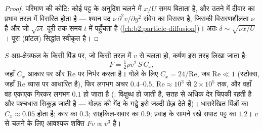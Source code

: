 \begin{proof}
परिमाण की कोटि: कोई  पट्ट के अनुदिश चलने में $x/U$ समय बिताता
है, और उतने में दीवार का प्रभाव तरल में विसरित होता है --- श्यान पद
$\nu\,\partial^2v/\partial y^2$ संवेग का विसरण है, जिसकी विसरणशीलता $\nu$ है
और जो $\sqrt{\nu t}$ दूरी तक समय $t$ में पहुँचता है
(\cref{ch:b2:particle-diffusion})। अतः $\delta \sim \sqrt{\nu x
/U}$। पूरा (प्रांटल) सिद्धांत स्वीकृत है।
\end{proof}

\begin{proposition}[ऊँची रेनल्ड्स संख्या पर कर्षण]\label{prop:b2:viscous-flows:drag}
$S$ अग्र-क्षेत्रफल के किसी पिंड पर, जो किसी तरल में $v$ से चलता हो,
कर्षण इस तरह लिखा जाता है:
\[
F = \tfrac12\rho v^2\,S\,C_x ,
\]
जहाँ \emph{} $C_x$ आकार पर और
$\mathrm{Re}$ पर निर्भर करता है। गोले के लिए $C_x = 24/\mathrm{Re}$, जब $\mathrm{Re} \ll 1$ (स्टोक्स,
जहाँ $\mathrm{Re}$ व्यास पर आधारित है), फिर लगभग अचर $0.4$--$0.5$,
$\mathrm{Re} \approx 10^3$ से $2 \times 10^5$ तक, और वहाँ वह एकाएक
गिरकर लगभग $0.1$ हो जाता है (\emph{}:  विक्षुब्ध हो
जाती है, सतह से अधिक देर चिपकी रहती है और पश्चधारा सिकुड़ जाती है ---
गोल्फ़ की गेंद के गड्ढे इसे जल्दी छेड़ देते हैं)। धारारेखित पिंडों का
$C_x \approx 0.05$ होता है; कार का $0.3$; साइकिल-सवार का $0.9$; प्रवाह के सामने
रखे सपाट पट्ट का $1.2$। $v$ से चलने के लिए आवश्यक शक्ति $Fv \propto v^3$ है।
\end{proposition}
\admitted

